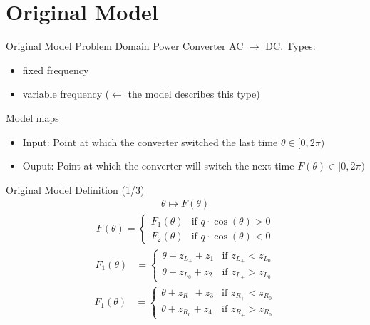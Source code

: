 
\section{Original Model}

\begin{frame}{Original Model Problem Domain}
	Power Converter AC $\to$ DC.
	Types:
	\begin{itemize}
		\item fixed frequency
		\item variable frequency ($\leftarrow$ the model describes this type)
	\end{itemize}

	\vspace{2em}
	Model maps
	\begin{itemize}
		\item Input: Point at which the converter switched the last time $\theta \in [0, 2 \pi)$
		\item Ouput: Point at which the converter will switch the next time $F(\theta) \in [0, 2 \pi)$
	\end{itemize}
\end{frame}

\begin{frame}{Original Model Definition (1/3)}
	\vspace{-3.0em}
	\begin{align}
		\theta \mapsto F(\theta)
	\end{align}
	\begin{align}
		F(\theta) = \begin{cases}
			            F_1(\theta) & \text{if } q \cdot \cos(\theta) > 0 \\
			            F_2(\theta) & \text{if } q \cdot \cos(\theta) < 0
		            \end{cases}
	\end{align}
	\begin{align}
		F_1(\theta) & = \begin{cases}
			                \theta + z_{L_+} + z_1 & \text{if } z_{L_+} < z_{L_0} \\
			                \theta + z_{L_0} + z_2 & \text{if } z_{L_+} > z_{L_0}
		                \end{cases}
	\end{align}
	\begin{align}
		F_1(\theta) & = \begin{cases}
			                \theta + z_{R_+} + z_3 & \text{if } z_{R_+} < z_{R_0} \\
			                \theta + z_{R_0} + z_4 & \text{if } z_{R_+} > z_{R_0}
		                \end{cases}
	\end{align}
\end{frame}

